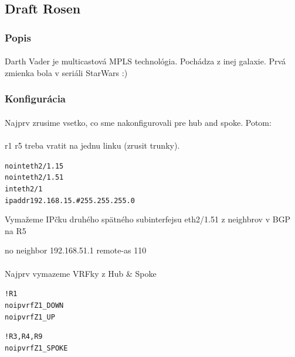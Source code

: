 \documentclass[12pt,twoside,a4paper]{report}
\begin{document}
\subsection{Draft Rosen}
\subsubsection{Popis}
\paragraph{}
Darth Vader je multicastová MPLS technológia. Pochádza z inej galaxie. Prvá zmienka bola v seriáli StarWars :)

\subsubsection{Konfigurácia}
\paragraph{}
Najprv zrusime vsetko, co sme nakonfigurovali pre hub and spoke. Potom:

\paragraph{}
r1 r5 treba vratit na jednu linku (zrusit trunky). 
\noindent
{\selectfont
\begin{small}
\begin{alltt}
no int eth2/1.15
no int eth2/1.51
int eth2/1
ip addr 192.168.15.# 255.255.255.0
\end{alltt}
\end{small}
}

Vymažeme IPčku druhého spätného subinterfejsu eth2/1.51  z neighbrov v BGP na R5

no neighbor 192.168.51.1 remote-as 110



\paragraph{}
Najprv vymazeme VRFky z Hub \& Spoke
\noindent
{\selectfont
\begin{small}
\begin{alltt}
!R1
no ip vrf Z1_DOWN
no ip vrf Z1_UP

!R3, R4, R9
no ip vrf Z1_SPOKE
\end{alltt}
\end{small}
}
\end{document}
